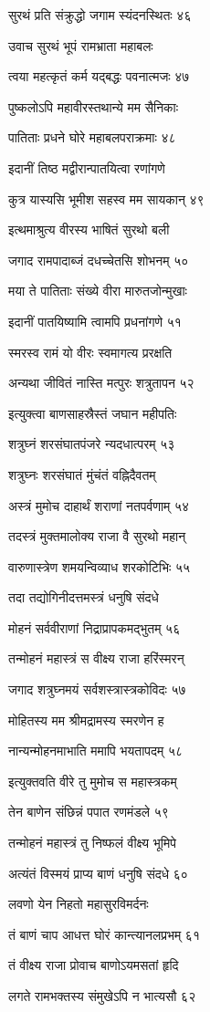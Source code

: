 सुरथं प्रति संक्रुद्धो जगाम स्यंदनस्थितः ४६

उवाच सुरथं भूपं रामभ्राता महाबलः

त्वया महत्कृतं कर्म यद्बद्धः पवनात्मजः ४७

पुष्कलोऽपि महावीरस्तथान्ये मम सैनिकाः

पातिताः प्रधने घोरे महाबलपराक्रमाः ४८

इदानीं तिष्ठ मद्वीरान्पातयित्वा रणांगणे

कुत्र यास्यसि भूमीश सहस्व मम सायकान् ४९

इत्थमाश्रुत्य वीरस्य भाषितं सुरथो बली

जगाद रामपादाब्जं दधच्चेतसि शोभनम् ५०

मया ते पातिताः संख्ये वीरा मारुतजोन्मुखाः

इदानीं पातयिष्यामि त्वामपि प्रधनांगणे ५१

स्मरस्व रामं यो वीरः स्वमागत्य प्ररक्षति

अन्यथा जीवितं नास्ति मत्पुरः शत्रुतापन ५२

इत्युक्त्वा बाणसाहस्रैस्तं जघान महीपतिः

शत्रुघ्नं शरसंघातपंजरे न्यदधात्परम् ५३

शत्रुघ्नः शरसंघातं मुंचंतं वह्निदैवतम्

अस्त्रं मुमोच दाहार्थं शराणां नतपर्वणाम् ५४

तदस्त्रं मुक्तमालोक्य राजा वै सुरथो महान्

वारुणास्त्रेण शमयन्विव्याध शरकोटिभिः ५५

तदा तद्योगिनीदत्तमस्त्रं धनुषि संदधे

मोहनं सर्ववीराणां निद्राप्रापकमद्भुतम् ५६

तन्मोहनं महास्त्रं स वीक्ष्य राजा हरिंस्मरन्

जगाद शत्रुघ्नमयं सर्वशस्त्रास्त्रकोविदः ५७

मोहितस्य मम श्रीमद्रामस्य स्मरणेन ह

नान्यन्मोहनमाभाति ममापि भयतापदम् ५८

इत्युक्तवति वीरे तु मुमोच स महास्त्रकम्

तेन बाणेन संछिन्नं पपात रणमंडले ५९

तन्मोहनं महास्त्रं तु निष्फलं वीक्ष्य भूमिपे

अत्यंतं विस्मयं प्राप्य बाणं धनुषि संदधे ६०

लवणो येन निहतो महासुरविमर्दनः

तं बाणं चाप आधत्त घोरं कान्त्यानलप्रभम् ६१

तं वीक्ष्य राजा प्रोवाच बाणोऽयमसतां हृदि

लगते रामभक्तस्य संमुखेऽपि न भात्यसौ ६२

